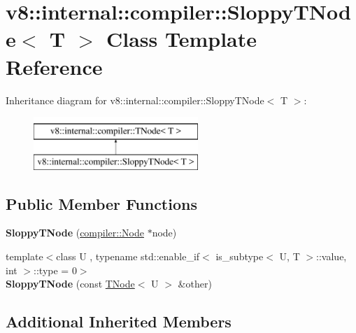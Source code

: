 \hypertarget{classv8_1_1internal_1_1compiler_1_1SloppyTNode}{}\section{v8\+:\+:internal\+:\+:compiler\+:\+:Sloppy\+T\+Node$<$ T $>$ Class Template Reference}
\label{classv8_1_1internal_1_1compiler_1_1SloppyTNode}
Inheritance diagram for v8\+:\+:internal\+:\+:compiler\+:\+:Sloppy\+T\+Node$<$ T $>$\+:\begin{figure}[H]
\begin{center}
\leavevmode
\includegraphics[height=2.000000cm]{classv8_1_1internal_1_1compiler_1_1SloppyTNode}
\end{center}
\end{figure}
\subsection*{Public Member Functions}
\begin{DoxyCompactItemize}
\item 
\mbox{\label{classv8_1_1internal_1_1compiler_1_1SloppyTNode_add919af5921aa1066db895c77085a100}} 
{\bfseries Sloppy\+T\+Node} (\mbox{\hyperlink{classv8_1_1internal_1_1compiler_1_1Node}{compiler\+::\+Node}} $\ast$node)
\item 
\mbox{\label{classv8_1_1internal_1_1compiler_1_1SloppyTNode_addb01a1399123f9b300ddffccde65352}} 
{\footnotesize template$<$class U , typename std\+::enable\+\_\+if$<$ is\+\_\+subtype$<$ U, T $>$\+::value, int $>$\+::type  = 0$>$ }\\{\bfseries Sloppy\+T\+Node} (const \mbox{\hyperlink{classv8_1_1internal_1_1compiler_1_1TNode}{T\+Node}}$<$ U $>$ \&other)
\end{DoxyCompactItemize}
\subsection*{Additional Inherited Members}


